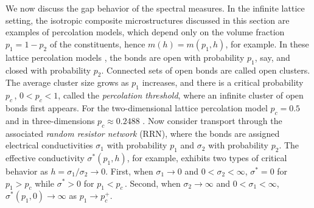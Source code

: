 \documentclass{cmslatex}
\begin{document}
We now discuss the gap behavior of the spectral measures. In the
infinite lattice setting, the isotropic composite 
microstructures discussed in this section are examples of percolation
models, which depend only on the volume fraction $p_1=1-p_2$ of the
constituents, hence $m(h)=m(p_1,h)$, for example. In these lattice
percolation models \cite{Stauffer-92,Torquato:RHM-02}, the bonds are 
open with probability $p_1$, say, and closed with probability
$p_2$. Connected sets of open bonds are called open clusters. The
average cluster size grows as $p_1$ increases, and there is a critical
probability $p_c\,$, $0<p_c<1$, called the \emph{percolation
  threshold}, where an infinite cluster of open bonds first
appears. For the two-dimensional lattice percolation model $p_c=0.5$
and in three-dimensions $p_c\approx0.2488$ 
\cite{Stauffer-92,Torquato:RHM-02}. Now consider transport through the
associated \emph{random resistor network} (RRN), where the bonds are
assigned electrical conductivities $\sigma_1$ with probability $p_1$ and
$\sigma_2$ with probability $p_2$. The effective conductivity $\sigma^*(p_1,h)$,
for example, exhibits two types of critical behavior as
$h=\sigma_1/\sigma_2\to0$. First, when $\sigma_1\to0$ and $0<\sigma_2<\infty$, $\sigma^*=0$ for
$p_1>p_c$ while $\sigma^*>0$ for $p_1<p_c\,$.
Second, when $\sigma_2\to\infty$ and $0<\sigma_1<\infty$, $\sigma^*(p_1,0) \to \infty$ as $p_1\to p_c^+$.
\end{document}
